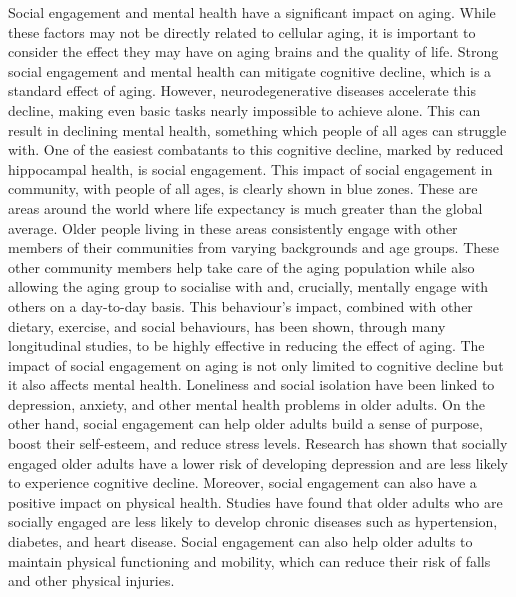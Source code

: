 \documentclass{article}
\begin{document}
Social engagement and mental health have a significant impact on aging. While these factors may not be directly related to cellular aging, it is important to consider the effect they may have on aging brains and the quality of life. Strong social engagement and mental health can mitigate cognitive decline, which is a standard effect of aging. However, neurodegenerative diseases accelerate this decline, making even basic tasks nearly impossible to achieve alone. This can result in declining mental health, something which people of all ages can struggle with. One of the easiest combatants to this cognitive decline, marked by reduced hippocampal health, is social engagement. This impact of social engagement in community, with people of all ages, is clearly shown in blue zones. These are areas around the world where life expectancy is much greater than the global average. Older people living in these areas consistently engage with other members of their communities from varying backgrounds and age groups. These other community members help take care of the aging population while also allowing the aging group to socialise with and, crucially, mentally engage with others on a day-to-day basis. This behaviour's impact, combined with other dietary, exercise, and social behaviours, has been shown, through many longitudinal studies, to be highly effective in reducing the effect of aging. The impact of social engagement on aging is not only limited to cognitive decline but it also affects mental health. Loneliness and social isolation have been linked to depression, anxiety, and other mental health problems in older adults. On the other hand, social engagement can help older adults build a sense of purpose, boost their self-esteem, and reduce stress levels. Research has shown that socially engaged older adults have a lower risk of developing depression and are less likely to experience cognitive decline. Moreover, social engagement can also have a positive impact on physical health. Studies have found that older adults who are socially engaged are less likely to develop chronic diseases such as hypertension, diabetes, and heart disease. Social engagement can also help older adults to maintain physical functioning and mobility, which can reduce their risk of falls and other physical injuries.
\end{document}
